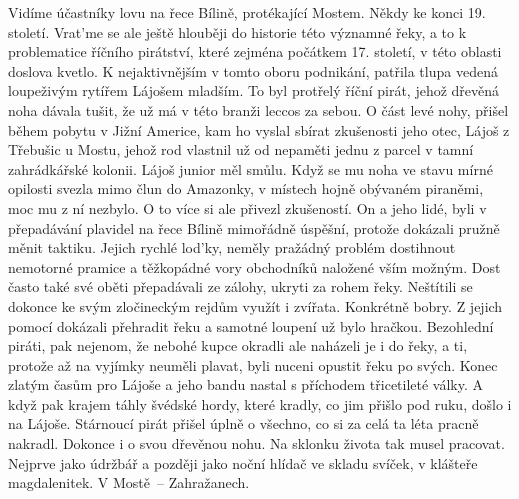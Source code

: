 
Vidíme účastníky lovu na řece Bílině, protékající Mostem. Někdy ke
konci 19. století. Vrat'me se ale ještě hlouběji do historie této
významné řeky, a to k problematice říčního pirátství, které zejména
počátkem 17. století, v této oblasti doslova kvetlo. K nejaktivnějším
v tomto oboru podnikání, patřila tlupa vedená loupeživým rytířem
Lájošem mladším. To byl protřelý říční pirát, jehož dřevěná noha
dávala tušit, že už má v této branži leccos za sebou. O část levé
nohy, přišel během pobytu v Jižní Americe, kam ho vyslal sbírat
zkušenosti jeho otec, Lájoš z Třebušic u Mostu, jehož rod vlastnil už
od nepaměti jednu z parcel v tamní zahrádkářské kolonii. Lájoš junior
měl smůlu. Když se mu noha ve stavu mírné opilosti svezla mimo člun do
Amazonky, v místech hojně obývaném piraněmi, moc mu z ní nezbylo. O to
více si ale přivezl zkušeností. On a jeho lidé, byli v přepadávání
plavidel na řece Bílině mimořádně úspěšní, protože dokázali pružně
měnit taktiku. Jejich rychlé lod'ky, neměly pražádný problém
dostihnout nemotorné pramice a těžkopádné vory obchodníků naložené
vším možným. Dost často také své oběti přepadávali ze zálohy, ukryti
za rohem řeky. Neštítili se dokonce ke svým zločineckým rejdům využít
i zvířata. Konkrétně bobry. Z jejich pomocí dokázali přehradit řeku a
samotné loupení už bylo hračkou. Bezohlední piráti, pak nejenom, že
nebohé kupce okradli ale naházeli je i do řeky, a ti, protože až na
vyjímky neuměli plavat, byli nuceni opustit řeku po svých. Konec
zlatým časům pro Lájoše a jeho bandu nastal s příchodem třicetileté
války. A když pak krajem táhly švédské hordy, které kradly, co jim
přišlo pod ruku, došlo i na Lájoše. Stárnoucí pirát přišel úplně o
všechno, co si za celá ta léta pracně nakradl. Dokonce i o svou
dřevěnou nohu. Na sklonku života tak musel pracovat. Nejprve jako
údržbář a později jako noční hlídač ve skladu svíček, v klášteře
magdalenitek. V Mostě~-- Zahražanech.
